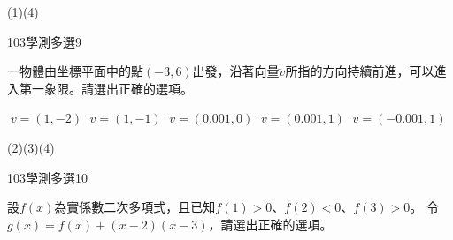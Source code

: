 \begin{QUESTIONS}
\begin{QUESTION}
        \begin{QANS}
            (1)(4)
        \end{QANS}
        \begin{QSOLLIST}
        \end{QSOLLIST}
        \begin{QEMPTYSPACE}
        \end{QEMPTYSPACE}
    \end{QUESTION}
    \begin{QUESTION}
        \begin{ExamInfo}{103}{學測}{多選}{9}
        \end{ExamInfo}
        \begin{ExamAnsRateInfo}{71}{94}{77}{42}
        \end{ExamAnsRateInfo}
        \begin{QBODY}
			一物體由坐標平面中的點$(-3,6)$出發，沿著向量$\lvec{v}$所指的方向持續前進，可以進入第一象限。請選出正確的選項。
			\begin{QOPS}
				\QOP $\lvec{v}=(1,-2)$
				\QOP $\lvec{v}=(1,-1)$
				\QOP $\lvec{v}=(0.001,0)$
				\QOP $\lvec{v}=(0.001,1)$
				\QOP $\lvec{v}=(-0.001,1)$
			\end{QOPS}
        \end{QBODY}
        \begin{QFROMS}
        \end{QFROMS}
        \begin{QTAGS}\end{QTAGS}
        \begin{QANS}
            (2)(3)(4)
        \end{QANS}
        \begin{QSOLLIST}
        \end{QSOLLIST}
        \begin{QEMPTYSPACE}
        \end{QEMPTYSPACE}
    \end{QUESTION}
    \begin{QUESTION}
        \begin{ExamInfo}{103}{學測}{多選}{10}
        \end{ExamInfo}
        \begin{ExamAnsRateInfo}{53}{83}{52}{24}
        \end{ExamAnsRateInfo}
        \begin{QBODY}
		設$f(x)$為實係數二次多項式，且已知$f(1)>0$、$f(2)<0$、$f(3)>0$。
		令$g(x)=f(x)+(x-2)(x-3)$，請選出正確的選項。
		\begin{QOPS}

\end{QOPS}
\end{QBODY}
\end{QUESTION}
\end{QUESTIONS}

